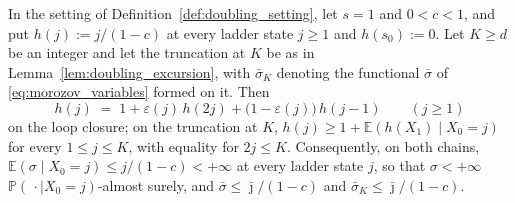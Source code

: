 \begin{lemma}\label{lem:doubling_supersolution}
In the setting of Definition~\ref{def:doubling_setting}, let $s=1$ and $0<c<1$, and put
$h(j):=j/(1-c)$ at every ladder state $j\geq1$ and $h(s_0):=0$. Let $K\geq d$ be an integer
and let the truncation at $K$ be as in Lemma~\ref{lem:doubling_excursion}, with $\bar\sigma_K$
denoting the functional $\bar\sigma$ of \eqref{eq:morozov_variables} formed on it. Then
\begin{equation}\label{eq:doubling_super}
    h(j)\;=\;1+\varepsilon(j)\,h(2j)+\bigl(1-\varepsilon(j)\bigr)\,h(j-1)
    \qquad(j\geq1)
\end{equation}
on the loop closure; on the truncation at $K$, $h(j)\geq1+\mathbb E(h(X_1)\mid X_0=j)$ for every
$1\leq j\leq K$, with equality for $2j\leq K$. Consequently, on both chains,
$\mathbb E(\sigma\mid X_0=j)\leq j/(1-c)<+\infty$ at every ladder state $j$, so that $\sigma<+\infty$
$\mathbb P(\,\cdot\mid X_0=j)$-almost surely, and $\bar\sigma\leq\bar\jmath/(1-c)$ and
$\bar\sigma_K\leq\bar\jmath/(1-c)$.
\end{lemma}

